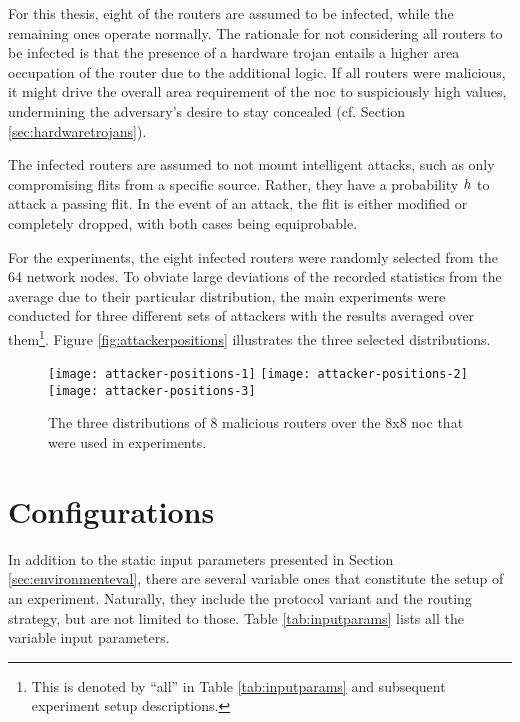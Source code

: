 For this thesis, eight of the routers are assumed to be infected, while the remaining ones operate normally. The rationale for not considering all
routers to be infected is that the presence of a hardware trojan entails a higher area occupation of the router due to the additional logic. If all
routers were malicious, it might drive the overall area requirement of the \gls{noc} to suspiciously high values, undermining the adversary's desire
to stay concealed (cf. Section \ref{sec:hardwaretrojans}).

The infected routers are assumed to not mount intelligent attacks, such as only compromising flits from a specific source. Rather, they have a
probability $h{}$ to attack a passing flit. In the event of an attack, the flit is either modified or completely dropped, with both cases
being equiprobable.

For the experiments, the eight infected routers were randomly selected from the 64 network nodes. To obviate large deviations of the recorded
statistics from the average due to their particular distribution, the main experiments were conducted for three different sets of attackers with the
results averaged over them\footnote{This is denoted by \enquote{all} in Table \ref{tab:inputparams} and subsequent experiment setup descriptions.}.
Figure \vref{fig:attackerpositions} illustrates the three selected distributions.

\begin{figure}
    \texttt{[image: attacker-positions-1]}\hfill
    \texttt{[image: attacker-positions-2]}\hfill
    \texttt{[image: attacker-positions-3]}
    \caption[Malicious router distributions]{The three distributions of 8 malicious routers over the 8x8 \gls{noc} that were used in experiments.}
    \label{fig:attackerpositions}
\end{figure}

\section{Configurations}\label{sec:configurations}
In addition to the static input parameters presented in Section \ref{sec:environmenteval}, there are several variable ones that constitute the setup
of an experiment. Naturally, they include the protocol variant and the routing strategy, but are not limited to those. Table \vref{tab:inputparams}
lists all the variable input parameters.

